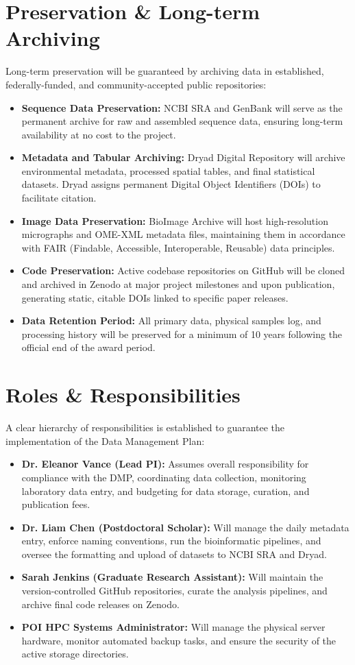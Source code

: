 \documentclass[10pt,letterpaper]{article}
\begin{document}
\section{Preservation \& Long-term Archiving}
Long-term preservation will be guaranteed by archiving data in established, federally-funded, and community-accepted public repositories:
\begin{itemize}
    \item \textbf{Sequence Data Preservation:} NCBI SRA and GenBank will serve as the permanent archive for raw and assembled sequence data, ensuring long-term availability at no cost to the project.
    \item \textbf{Metadata and Tabular Archiving:} Dryad Digital Repository will archive environmental metadata, processed spatial tables, and final statistical datasets. Dryad assigns permanent Digital Object Identifiers (DOIs) to facilitate citation.
    \item \textbf{Image Data Preservation:} BioImage Archive will host high-resolution micrographs and OME-XML metadata files, maintaining them in accordance with FAIR (Findable, Accessible, Interoperable, Reusable) data principles.
    \item \textbf{Code Preservation:} Active codebase repositories on GitHub will be cloned and archived in Zenodo at major project milestones and upon publication, generating static, citable DOIs linked to specific paper releases.
    \item \textbf{Data Retention Period:} All primary data, physical samples log, and processing history will be preserved for a minimum of 10 years following the official end of the award period.
\end{itemize}

\section{Roles \& Responsibilities}
A clear hierarchy of responsibilities is established to guarantee the implementation of the Data Management Plan:
\begin{itemize}
    \item \textbf{Dr. Eleanor Vance (Lead PI):} Assumes overall responsibility for compliance with the DMP, coordinating data collection, monitoring laboratory data entry, and budgeting for data storage, curation, and publication fees.
    \item \textbf{Dr. Liam Chen (Postdoctoral Scholar):} Will manage the daily metadata entry, enforce naming conventions, run the bioinformatic pipelines, and oversee the formatting and upload of datasets to NCBI SRA and Dryad.
    \item \textbf{Sarah Jenkins (Graduate Research Assistant):} Will maintain the version-controlled GitHub repositories, curate the analysis pipelines, and archive final code releases on Zenodo.
    \item \textbf{POI HPC Systems Administrator:} Will manage the physical server hardware, monitor automated backup tasks, and ensure the security of the active storage directories.
\end{itemize}
\end{document}
